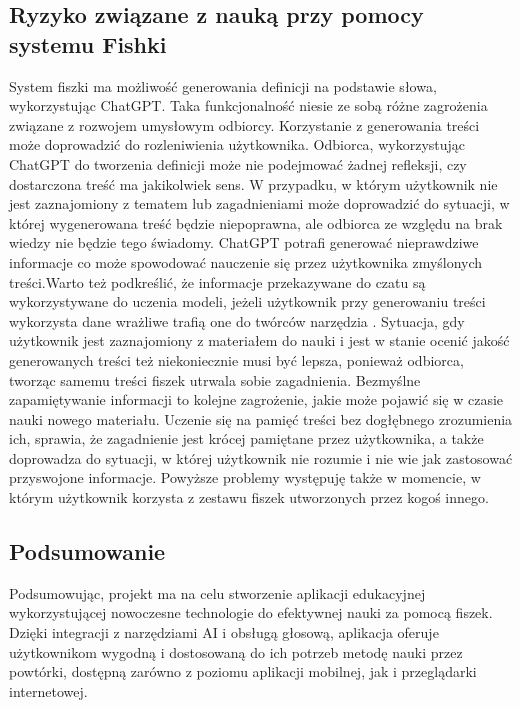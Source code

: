 \subsection{Ryzyko związane z nauką przy pomocy systemu Fishki}
System fiszki ma możliwość generowania definicji na podstawie słowa, wykorzystując ChatGPT. Taka funkcjonalność niesie ze sobą różne zagrożenia związane z rozwojem umysłowym odbiorcy. Korzystanie z generowania treści może doprowadzić do rozleniwienia użytkownika. Odbiorca, wykorzystując ChatGPT do tworzenia definicji może nie podejmować żadnej refleksji, czy dostarczona treść ma jakikolwiek sens. W przypadku, w którym użytkownik nie jest zaznajomiony z tematem lub zagadnieniami może doprowadzić do sytuacji, w której wygenerowana treść będzie niepoprawna, ale odbiorca ze względu na brak wiedzy nie będzie tego świadomy. ChatGPT potrafi generować nieprawdziwe informacje co może spowodować nauczenie się przez użytkownika zmyślonych treści.Warto też podkreślić, że informacje przekazywane do czatu są wykorzystywane do uczenia modeli, jeżeli użytkownik przy generowaniu treści wykorzysta dane wrażliwe trafią one do twórców narzędzia \cite{chatGptRisk}. Sytuacja, gdy użytkownik jest zaznajomiony z materiałem do nauki i jest w stanie ocenić jakość generowanych treści też niekoniecznie musi być lepsza, ponieważ odbiorca, tworząc samemu treści fiszek utrwala sobie zagadnienia. Bezmyślne zapamiętywanie informacji to kolejne zagrożenie, jakie może pojawić się w czasie nauki nowego materiału. Uczenie się na pamięć treści bez dogłębnego zrozumienia ich, sprawia, że zagadnienie jest krócej pamiętane przez użytkownika, a także doprowadza do sytuacji, w której użytkownik nie rozumie i nie wie jak zastosować przyswojone informacje. Powyższe problemy występuję także w momencie, w którym użytkownik korzysta z zestawu fiszek utworzonych przez kogoś innego.

\subsection{Podsumowanie}
Podsumowując, projekt ma na celu stworzenie aplikacji edukacyjnej wykorzystującej nowoczesne technologie do efektywnej nauki za pomocą fiszek. Dzięki integracji z narzędziami AI i obsługą głosową, aplikacja oferuje użytkownikom wygodną i dostosowaną do ich potrzeb metodę nauki przez powtórki, dostępną zarówno z poziomu aplikacji mobilnej, jak i przeglądarki internetowej.
